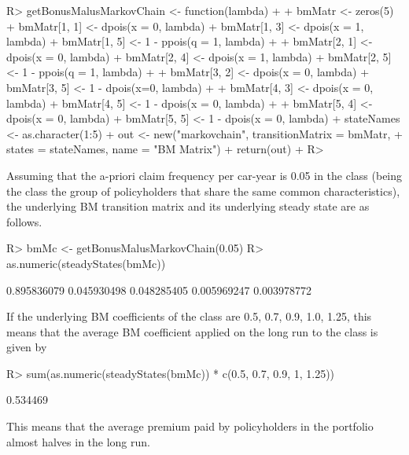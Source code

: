 \documentclass[nojss]{jss}
\begin{document}
\begin{Schunk}
\begin{Sinput}
R> getBonusMalusMarkovChain <- function(lambda)
+  {
+  	bmMatr <- zeros(5)
+  	bmMatr[1, 1] <- dpois(x = 0, lambda)
+  	bmMatr[1, 3] <- dpois(x = 1, lambda)
+  	bmMatr[1, 5] <- 1 - ppois(q = 1, lambda)
+  	
+  	bmMatr[2, 1] <- dpois(x = 0, lambda)
+  	bmMatr[2, 4] <- dpois(x = 1, lambda)
+  	bmMatr[2, 5] <- 1 - ppois(q = 1, lambda)
+  	
+  	bmMatr[3, 2] <- dpois(x = 0, lambda)
+  	bmMatr[3, 5] <- 1 - dpois(x=0, lambda)
+   
+  	bmMatr[4, 3] <- dpois(x = 0, lambda)
+  	bmMatr[4, 5] <- 1 - dpois(x = 0, lambda)
+    
+  	bmMatr[5, 4] <- dpois(x = 0, lambda)
+  	bmMatr[5, 5] <- 1 - dpois(x = 0, lambda)
+  	stateNames <- as.character(1:5)
+  	out <- new("markovchain", transitionMatrix = bmMatr, 
+               states = stateNames, name = "BM Matrix")
+  	return(out)
+  }
R> 
\end{Sinput}
\end{Schunk}

Assuming that the a-priori claim frequency per car-year is 0.05 in the class (being the class the group of policyholders that share the same common characteristics), the underlying BM transition matrix and its underlying steady state are as follows.

\begin{Schunk}
\begin{Sinput}
R> bmMc <- getBonusMalusMarkovChain(0.05)
R> as.numeric(steadyStates(bmMc))
\end{Sinput}
\begin{Soutput}
[1] 0.895836079 0.045930498 0.048285405 0.005969247 0.003978772
\end{Soutput}
\end{Schunk}

If the underlying BM coefficients of the class are 0.5, 0.7, 0.9, 1.0, 1.25, this
means that the average BM coefficient applied on the long run to the class is given by

\begin{Schunk}
\begin{Sinput}
R> sum(as.numeric(steadyStates(bmMc)) * c(0.5, 0.7, 0.9, 1, 1.25))
\end{Sinput}
\begin{Soutput}
[1] 0.534469
\end{Soutput}
\end{Schunk}

This means that the average premium paid by policyholders in the portfolio
almost halves in the long run.
\end{document}
